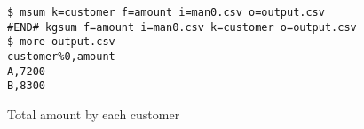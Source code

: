 \begin{figure}[htbp]
\begin{Verbatim}[baselinestretch=0.7,frame=single]
$ msum k=customer f=amount i=man0.csv o=output.csv
#END# kgsum f=amount i=man0.csv k=customer o=output.csv
$ more output.csv
customer%0,amount
A,7200
B,8300
\end{Verbatim}
\caption{Total amount by each customer\label{fig:abstract1_1}}
\end{figure}
